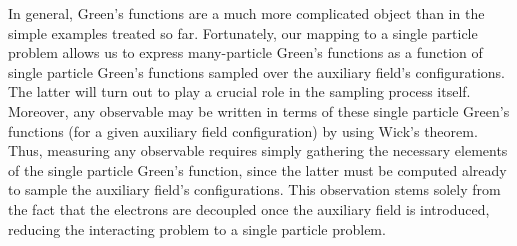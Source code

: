 In general, Green's functions are a much more complicated object than in the simple examples treated so far.
Fortunately, our mapping to a single particle problem allows us to express many-particle Green's functions as a function of single particle Green's functions sampled over the auxiliary field's configurations.
The latter will turn out to play a crucial role in the sampling process itself.
Moreover, any observable may be written in terms of these single particle Green's functions (for a given auxiliary field configuration) by using Wick's theorem.
Thus, measuring any observable requires simply gathering the necessary elements of the single particle Green's function, since the latter must be computed already to sample the auxiliary field's configurations.
This observation stems solely from the fact that the electrons are decoupled once the auxiliary field is introduced, reducing the interacting problem to a single particle problem.
%
%
